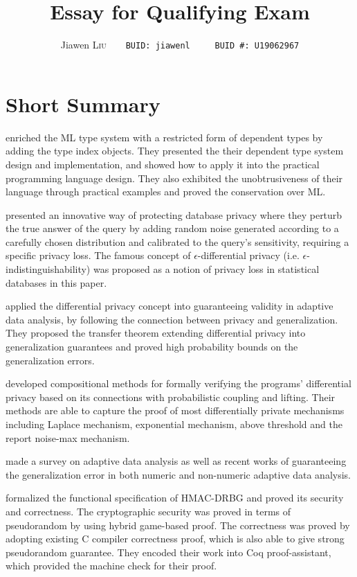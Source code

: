 \documentclass{article}
\title{\textbf{Essay for Qualifying Exam}}
\author{
Jiawen \textsc{Liu}\ \ \ \
\texttt{BUID: jiawenl \ \ \ \ BUID \#: U19062967}
}
\date{}
\begin{document}
\maketitle 

\section{Short Summary}

\cite{xi1999dependent} enriched the ML type system with a restricted form of dependent types by adding the type index objects. They presented the their dependent type system design and implementation, and showed how to apply it into the practical programming language design.
They also exhibited the unobtrusiveness of their language through practical examples and proved the conservation over ML.

\cite{dwork2006calibrating} presented an innovative way of protecting database privacy where they perturb the true answer of the query by adding random noise generated according to a carefully chosen distribution and calibrated to the query's sensitivity, requiring a specific privacy loss.
The famous concept of $\epsilon$-differential privacy (i.e. $\epsilon$-indistinguishability) was proposed as a notion of privacy loss in statistical databases in this paper.


\cite{dwork2015preserving} applied the differential privacy concept into guaranteeing validity in adaptive data analysis, by following the connection between privacy and generalization.
They proposed the transfer theorem extending differential privacy into generalization guarantees and proved high probability bounds on the generalization errors.

\cite{barthe2016proving} developed compositional methods for formally verifying the programs' differential privacy based on its connections with probabilistic coupling and lifting. Their methods are able to capture the proof of most differentially private mechanisms
including Laplace mechanism, exponential mechanism, above threshold and the report noise-max mechanism.

\cite{smith2017information} made a survey on adaptive data analysis as well as recent works of guaranteeing the generalization error in both numeric and non-numeric adaptive data analysis.

\cite{ye2017verified} formalized the functional specification of HMAC-DRBG and proved its security and correctness. The cryptographic security was proved in terms of pseudorandom by using hybrid game-based proof. The correctness was proved by adopting existing C compiler correctness proof, which is also able to give strong pseudorandom guarantee. They encoded their work into Coq proof-assistant, which provided the machine check for their proof.
\end{document}
